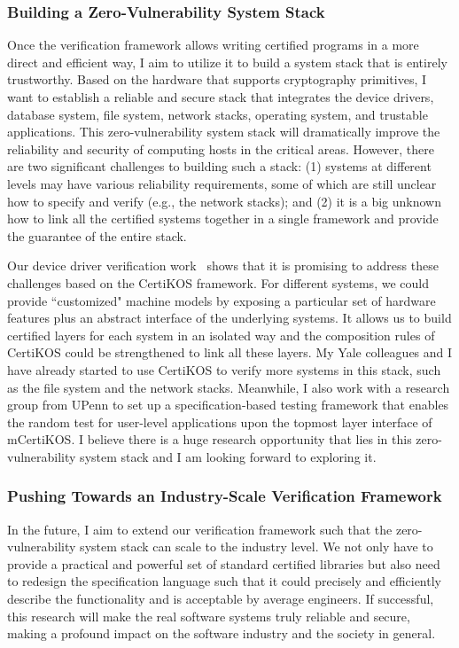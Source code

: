 \documentclass[a4paper, 10pt]{article}
\begin{document}
\begin{small}
\subsubsection*{\small Building a Zero-Vulnerability System Stack}
Once the verification framework allows writing certified programs in a more direct and efficient way, I aim to utilize it to build a system stack that is entirely trustworthy. Based on the hardware that supports cryptography primitives, I want to
establish a reliable and secure stack that integrates the device drivers,
database system, file system, network stacks, operating system,
 and trustable applications.
This zero-vulnerability system stack will dramatically improve
the reliability and security of computing hosts in the critical areas. 
However, there are two significant challenges to building such a stack:
(1)  systems at different levels may have various
reliability requirements, some of which are still unclear how
to specify and verify (e.g., the network stacks); and (2)
it is a big unknown how to link
all the certified systems together in a single framework
and provide the guarantee of the entire stack.

Our device driver verification work~\cite{pldi16-device} shows that
it is promising to address these challenges based on the CertiKOS framework. For different systems, we could
provide ``customized" machine models
by exposing a particular set of hardware features
plus an abstract interface of the underlying systems.
It allows us to build certified layers for each system
in an isolated way and the  composition rules of CertiKOS
could be strengthened to link all these layers. My Yale colleagues
and I have already started to use CertiKOS to verify more systems in this stack,
such as the file system and the network stacks.
Meanwhile, I also work with  a research group from UPenn to
set up a specification-based testing framework
that enables the random test for user-level applications upon the topmost layer interface of mCertiKOS.
I believe there is a huge research opportunity that
lies in this zero-vulnerability system stack
and I am looking forward to exploring it.


\subsubsection*{\small Pushing Towards  an Industry-Scale Verification Framework}
In the future, I aim to 
extend our verification framework such that
the  zero-vulnerability system stack can scale to the industry level. We not only have to provide a practical and powerful
set of standard certified libraries but also need to redesign
the specification language such that
it could precisely and efficiently describe the functionality
and is acceptable by average engineers.
If successful,
this research will make
the real software systems truly reliable and secure, making  a profound impact on the software industry
 and the society in general.
 
\vspace{0.5cm}

\end{small}
\end{document}
